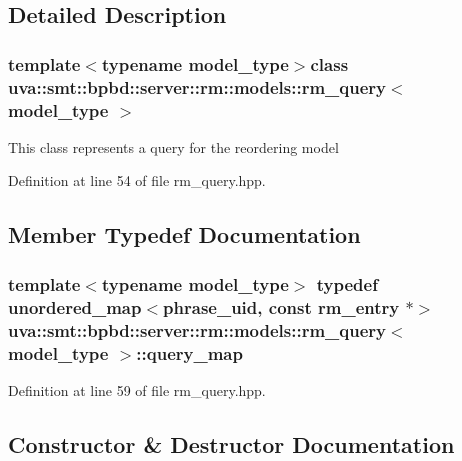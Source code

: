 \subsection{Detailed Description}
\subsubsection*{template$<$typename model\+\_\+type$>$class uva\+::smt\+::bpbd\+::server\+::rm\+::models\+::rm\+\_\+query$<$ model\+\_\+type $>$}

This class represents a query for the reordering model 

Definition at line 54 of file rm\+\_\+query.\+hpp.



\subsection{Member Typedef Documentation}
\hypertarget{classuva_1_1smt_1_1bpbd_1_1server_1_1rm_1_1models_1_1rm__query_a2ce9a5b1ffe611cca1ebf768d85aa4c9}{}
\subsubsection[{query\+\_\+map}]{\setlength{\rightskip}{0pt plus 5cm}template$<$typename model\+\_\+type$>$ typedef unordered\+\_\+map$<${\bf phrase\+\_\+uid}, const {\bf rm\+\_\+entry} $\ast$$>$ {\bf uva\+::smt\+::bpbd\+::server\+::rm\+::models\+::rm\+\_\+query}$<$ model\+\_\+type $>$\+::{\bf query\+\_\+map}}\label{classuva_1_1smt_1_1bpbd_1_1server_1_1rm_1_1models_1_1rm__query_a2ce9a5b1ffe611cca1ebf768d85aa4c9}


Definition at line 59 of file rm\+\_\+query.\+hpp.



\subsection{Constructor \& Destructor Documentation}
\hypertarget{classuva_1_1smt_1_1bpbd_1_1server_1_1rm_1_1models_1_1rm__query_a22e59e495920cee9ae789b64a23df412}{}

